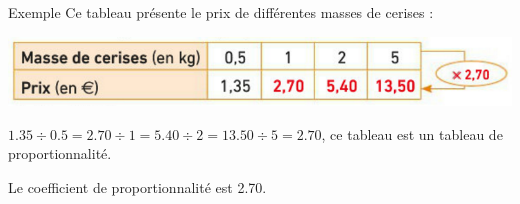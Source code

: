 \documentclass[xcolor={dvipsnames}]{beamer}
\begin{document}
	\begin{frame}
		\begin{exampleblock}{Exemple}
			Ce tableau présente le prix de différentes masses de cerises :
			\begin{center}
				
				\includegraphics[scale=0.5]{tb_prop1}
			\end{center}
		
		$\num{1,35} \div \num{0.5} = \num{2,70} \div 1 = \num{5.40} \div 2 = \num{13,50} \div 5 = \num{2.70} $, ce tableau est un tableau de proportionnalité. \pause
		
		Le coefficient de proportionnalité est \num{2.70}.
		\end{exampleblock}
	\end{frame}
\end{document}
